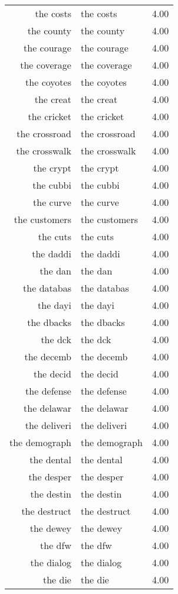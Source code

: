 \begin{table}[ht]
\begin{tabular}{rlr}
  the costs & the costs & 4.00 \\ 
  the county & the county & 4.00 \\ 
  the courage & the courage & 4.00 \\ 
  the coverage & the coverage & 4.00 \\ 
  the coyotes & the coyotes & 4.00 \\ 
  the creat & the creat & 4.00 \\ 
  the cricket & the cricket & 4.00 \\ 
  the crossroad & the crossroad & 4.00 \\ 
  the crosswalk & the crosswalk & 4.00 \\ 
  the crypt & the crypt & 4.00 \\ 
  the cubbi & the cubbi & 4.00 \\ 
  the curve & the curve & 4.00 \\ 
  the customers & the customers & 4.00 \\ 
  the cuts & the cuts & 4.00 \\ 
  the daddi & the daddi & 4.00 \\ 
  the dan & the dan & 4.00 \\ 
  the databas & the databas & 4.00 \\ 
  the dayi & the dayi & 4.00 \\ 
  the dbacks & the dbacks & 4.00 \\ 
  the dck & the dck & 4.00 \\ 
  the decemb & the decemb & 4.00 \\ 
  the decid & the decid & 4.00 \\ 
  the defense & the defense & 4.00 \\ 
  the delawar & the delawar & 4.00 \\ 
  the deliveri & the deliveri & 4.00 \\ 
  the demograph & the demograph & 4.00 \\ 
  the dental & the dental & 4.00 \\ 
  the desper & the desper & 4.00 \\ 
  the destin & the destin & 4.00 \\ 
  the destruct & the destruct & 4.00 \\ 
  the dewey & the dewey & 4.00 \\ 
  the dfw & the dfw & 4.00 \\ 
  the dialog & the dialog & 4.00 \\ 
  the die & the die & 4.00 \\ 

\end{tabular}
\end{table}
